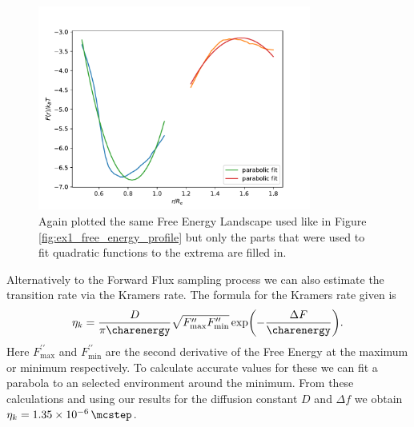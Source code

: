 \documentclass[../main.tex]{subfiles}
\begin{document}
\begin{figure}[htpb]
    \centering
    \includegraphics[width=0.8\textwidth]{../figures/ex2_parabolic_fit.pdf}
    \caption{
        Again plotted the same Free Energy Landscape used like in Figure \ref{fig:ex1_free_energy_profile} but only the parts that were used to fit quadratic functions to the extrema are filled in.
    }
    \label{fig:ex2_parabolic_fit}
\end{figure}

Alternatively to the Forward Flux sampling process we can also estimate the transition rate via the Kramers rate.
The formula for the Kramers rate given is 
\[
    \eta_k = \frac{D}{\pi \unit{\charenergy}} 
    \sqrt{F^{\prime \prime}_{ \text{max} } F^{\prime\prime}_{ \text{min} } } \exp( - \frac{\Delta F}{\unit{\charenergy}} )  
.\] 
Here $F^{\prime \prime}_{ \text{max} }$ and $F^{\prime \prime}_{ \text{min} }$ are the second derivative of the Free Energy at the maximum or minimum respectively.
To calculate accurate values for these we can fit a parabola to an selected environment around the minimum.
From these calculations and using our results for the diffusion constant $D$ and $\Delta f$ we obtain $\eta_k = \SI{1.35e-6}{\per\mcstep}$.


\ifSubfilesClassLoaded{
}{
}
\end{document}
